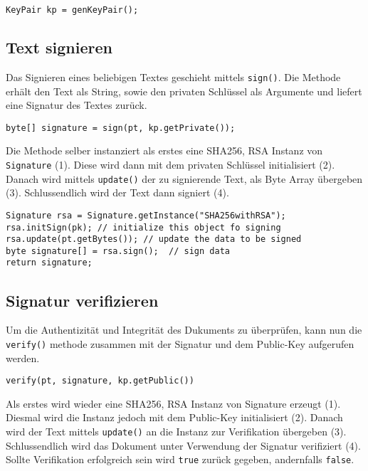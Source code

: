 \documentclass[12pt]{article}
\begin{document}
\begin{lstlisting}
KeyPair kp = genKeyPair();
\end{lstlisting}

\subsection{Text signieren}
Das Signieren eines beliebigen Textes geschieht mittels \texttt{sign()}. Die
Methode erhält den Text als String, sowie den privaten Schlüssel als Argumente
und liefert eine Signatur des Textes zurück.

\begin{lstlisting}
byte[] signature = sign(pt, kp.getPrivate());
\end{lstlisting}

Die Methode selber instanziert als erstes eine SHA256, RSA Instanz von
\texttt{Signature} (1). Diese wird dann mit dem privaten Schlüssel initialisiert
(2). Danach wird mittels \texttt{update()} der zu signierende Text, als Byte
Array übergeben (3).
Schlussendlich wird der Text dann signiert (4).

\begin{lstlisting}
Signature rsa = Signature.getInstance("SHA256withRSA");
rsa.initSign(pk); // initialize this object fo signing
rsa.update(pt.getBytes()); // update the data to be signed
byte signature[] = rsa.sign();  // sign data
return signature;
\end{lstlisting}

\subsection{Signatur verifizieren}
Um die Authentizität und Integrität des Dukuments zu überprüfen, kann nun
die \texttt{verify()} methode zusammen mit der Signatur und dem Public-Key
aufgerufen werden.

\begin{lstlisting}
verify(pt, signature, kp.getPublic())
\end{lstlisting}

Als erstes wird wieder eine SHA256, RSA Instanz von Signature erzeugt (1).
Diesmal wird die Instanz jedoch mit dem Public-Key initialisiert (2).
Danach wird der Text mittels \texttt{update()} an die Instanz zur Verifikation
übergeben (3). Schlussendlich wird das Dokument unter Verwendung der Signatur
verifiziert (4). Sollte Verifikation erfolgreich sein wird \texttt{true} zurück
gegeben, andernfalls \texttt{false}.
\end{document}
